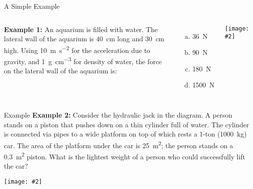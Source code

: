 \documentclass[12pt,aspectratio=169]{beamer}
\newcommand{\pic}[2]{\texttt{[image: \#2]}}
\begin{document}
\begin{frame}{A Simple Example}
  \begin{columns}

    \textbf{Example 1:} An aquarium is filled with water. The lateral wall of
    the aquarium is \SI{40}{\centi\metre} long and \SI{30}{\centi\metre} high.
    Using \SI{10}{\metre\per\second^2} for the acceleration due to gravity,
    and \SI{1}{\gram\per\centi\metre^3} for density of water, the force on the
    lateral wall of the aquarium is:
    \begin{enumerate}[(a)]
    \item\SI{36}{\newton}
    \item\SI{90}{\newton}
    \item\SI{180}{\newton}
    \item\SI{1500}{\newton}
    \end{enumerate}

    \pic{1}{home-fish-tank.jpg}
  \end{columns}
\end{frame}



\begin{frame}{Example}
  \textbf{Example 2:} Consider the hydraulic jack in the diagram. A person
  stands on a piston that pushes down on a thin cylinder full of water. The
  cylinder is connected via pipes to a wide platform on top of which rests a
  1-ton (\SI{1000}{\kilo\gram}) car. The area of the platform under the car is
  \SI{25}{\metre^2}; the person stands on a \SI{.3}{\metre^2} piston. What is
  the lightest weight of a person who could successfully lift the car?
  \begin{center}
    \vspace{-.2in}
    \pic{.4}{jack.png}
    
  \end{center}
\end{frame}
\end{document}

